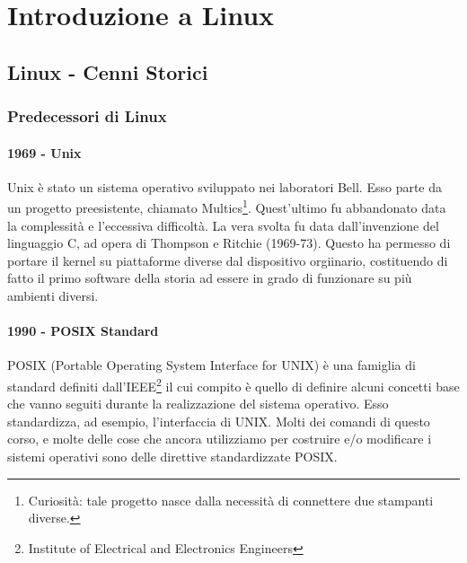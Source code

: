 \part{Introduzione a Linux}
\chapter{Linux - Cenni Storici}
\section{Predecessori di Linux}
\subsection{1969 - Unix}
Unix è stato un sistema operativo sviluppato nei laboratori Bell. Esso parte da un progetto preesistente, chiamato Multics\footnote{Curiosità: tale progetto nasce dalla necessità di connettere due stampanti diverse.}. Quest'ultimo fu abbandonato data la complessità e l'eccessiva difficoltà. La vera svolta fu data dall'invenzione del linguaggio C, ad opera di Thompson e Ritchie (1969-73). Questo ha permesso di portare il kernel su piattaforme diverse dal dispositivo orgiinario, costituendo di fatto il primo software della storia ad essere in grado di funzionare su più ambienti diversi. 

\subsection{1990 - POSIX Standard}
POSIX (Portable Operating System Interface for UNIX) è una famiglia di standard definiti dall'IEEE\footnote{Institute of Electrical and Electronics Engineers} il cui compito è quello di definire alcuni concetti base che vanno seguiti durante la realizzazione del sistema operativo. Esso standardizza, ad esempio, l'interfaccia di UNIX. Molti dei comandi 
di questo corso, e molte delle cose che ancora utilizziamo per costruire e/o modificare i sistemi operativi sono delle direttive standardizzate POSIX. 

